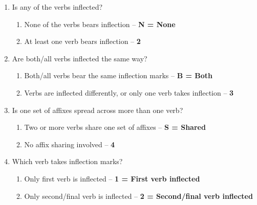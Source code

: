 \begin{enumerate}
\item Is any of the verbs inflected?
\begin{enumerate}
\item None of the verbs bears inflection -- \textbf{N = None}
\item At least one verb bears inflection -- \textbf{2}
\end{enumerate}
\item Are both/all verbs inflected the same way?
\begin{enumerate}
\item Both/all verbs bear the same inflection marks -- \textbf{B = Both}
\item Verbs are inflected differently, or only one verb takes inflection -- \textbf{3}
\end{enumerate}
\item Is one set of affixes spread across more than one verb?
\begin{enumerate}
\item Two or more verbs share one set of affixes -- \textbf{S = Shared}
\item No affix sharing involved -- \textbf{4}
\end{enumerate}
\item Which verb takes inflection marks?
\begin{enumerate}
\item Only first verb is inflected -- \textbf{1 = First verb inflected}
\item Only second/final verb is inflected -- \textbf{2 = Second/final verb inflected}
\end{enumerate}
\end{enumerate}

